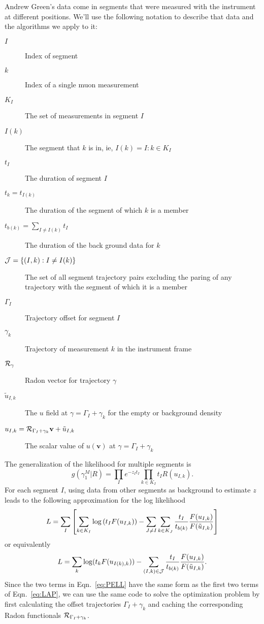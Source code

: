 \documentclass[twocolumn]{article}
\newcommand{\Radon}{{\cal R}}
\newcommand{\av}{\mathbf{v}}%
\newcommand{\like}{g}
\newcommand{\z}{z}%
\begin{document}
Andrew Green's data come in segments that were measured with the
instrument at different positions.  We'll use the following notation to
describe that data and the algorithms we apply to it:
\begin{description}
\item[$I$] Index of segment
\item[$k$] Index of a single muon measurement
\item[$K_I$] The set of measurements in segment $I$
\item[$I(k)$] The segment that $k$ is in, ie,  $I(k) = I:k\in K_I$
\item[$t_I$] The duration of segment $I$
\item[$t_k = t_{I(k)}$] The duration of the segment of which $k$ is a member
\item[$t_{b(k)} = \sum_{I\neq I(k)} t_I$] The duration of the back
  ground data for $k$
\item[${\cal J} = \{(I,k):I\neq I(k)\}$] The set of all segment
  trajectory pairs excluding the paring of any trajectory with the
  segment of which it is a member
\item[$\Gamma_I$] Trajectory offset for segment $I$
\item[$\gamma_k$] Trajectory of measurement $k$ in the instrument frame
\item[$\Radon_\gamma$] Radon vector for trajectory $\gamma$
\item[$\tilde u_{I,k}$] The $u$ field at $\gamma = \Gamma_I +
  \gamma_k$ for the empty or background density
\item[$u_{I,k}= \Radon_{\Gamma_I + \gamma_k} \av + \tilde u_{I,k}$]
  The scalar value of $u(\av)$ at $\gamma = \Gamma_I + \gamma_k$
\end{description}

The generalization of the likelihood for multiple segments is
\begin{equation*}
  \like(\gamma_1^M|R) = \prod_I e^{-\z_I t_I} \prod_{k \in K_I}  t_I R(u_{I,k}).
\end{equation*}
For each segment $I$, using data from other segments as background to
estimate $z$ leads to the following approximation for the log likelihood
\begin{equation*}
  \small L = \sum_I \left[ \sum_{k\in K_I} \log \left( t_I F(u_{I,k})
    \right) - \sum_{J\neq I} \sum_{k\in K_J} \frac {t_I}{t_{b(k)}}
    \frac{F(u_{I,k})}{F(\tilde u_{I,k})} \right]
\end{equation*}
or equivalently
\begin{equation}
  \label{eq:PELL}
  L = \sum_k \log(t_k F(u_{I(k),k})) - \sum_{(I,k) \in {\cal J}} \frac{t_{I}}{t_{b(k)}}
  \frac{F(u_{I,k})}{F(\tilde u_{I,k})}.
\end{equation}
Since the two terms in Eqn.~\eqref{eq:PELL} have the same form as the
first two terms of Eqn.~\eqref{eq:LAP}, we can use the same code to
solve the optimization problem by first calculating the offset
trajectories $\Gamma_I+\gamma_k$ and caching the corresponding Radon
functionals $\Radon_{\Gamma_I+\gamma_k}$.
\end{document}
